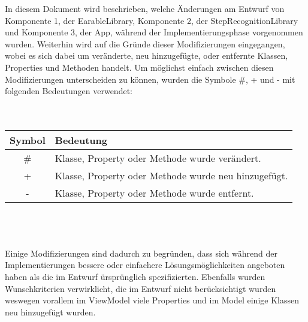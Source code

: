 \documentclass[../implementierung.tex]{subfiles}
\begin{document}
	In diesem Dokument wird beschrieben, welche Änderungen am Entwurf von Komponente 1, der EarableLibrary, Komponente 2, der StepRecognitionLibrary und Komponente 3, der App, während der Implementierungsphase vorgenommen wurden. Weiterhin wird auf die Gründe dieser Modifizierungen eingegangen, wobei es sich dabei um veränderte, neu hinzugefügte, oder entfernte Klassen, Properties und Methoden handelt. Um möglichst einfach zwischen diesen Modifizierungen unterscheiden zu können, wurden die Symbole \#, + und - mit folgenden Bedeutungen verwendet:
	\\
	\\
	\\
	\begin{tabular}[h]{|c|l|}
	\hline 
	Symbol & Bedeutung \\
	\hline 
	\# & Klasse, Property oder Methode wurde verändert. \\
	\hline 
	+ & Klasse, Property oder Methode wurde neu hinzugefügt. \\
	\hline 
	- & Klasse, Property oder Methode wurde entfernt. \\
	\hline 
	\end{tabular}
	\\
	\\
	\\
	Einige Modifizierungen sind dadurch zu begründen, dass sich während der Implementierungen bessere oder einfachere Lösungsmöglichkeiten angeboten haben als die im Entwurf ürsprünglich spezifizierten. Ebenfalls wurden Wunschkriterien verwirklicht, die im Entwurf nicht berücksichtigt wurden weswegen vorallem im ViewModel viele Properties und im Model einige Klassen neu hinzugefügt wurden.
\end{document}
